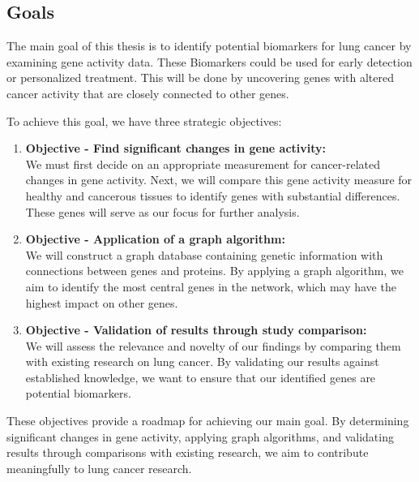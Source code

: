 \subsection{Goals} \label{subsec:goals}
The main goal of this thesis is to identify potential biomarkers for lung cancer by examining gene activity data.
These Biomarkers could be used for early detection or personalized treatment.
This will be done by uncovering genes with altered cancer activity that are closely connected to other genes.

To achieve this goal, we have three strategic objectives:
\begin{enumerate}
    \item \textbf{Objective - Find significant changes in gene activity:}\\
    We must first decide on an appropriate measurement for cancer-related changes in gene activity.
    Next, we will compare this gene activity measure for healthy and cancerous tissues to identify genes with substantial differences.
    These genes will serve as our focus for further analysis.
    \label{obj:delta_tpm}

    \item \textbf{Objective - Application of a graph algorithm:}\\
    We will construct a graph database containing genetic information with connections between genes and proteins.
    By applying a graph algorithm, we aim to identify the most central genes in the network,
    which may have the highest impact on other genes.
    \label{obj:graph_algorithm}

    \item \textbf{Objective - Validation of results through study comparison:}\\
    We will assess the relevance and novelty of our findings by comparing them with existing research on lung cancer.
    By validating our results against established knowledge, we want to ensure that our identified genes are potential biomarkers.
    \label{obj:validation}
\end{enumerate}

These objectives provide a roadmap for achieving our main goal.
By determining significant changes in gene activity, applying graph algorithms,
and validating results through comparisons with existing research,
we aim to contribute meaningfully to lung cancer research.
